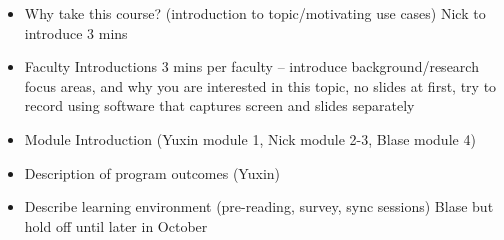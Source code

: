 \documentclass[12pt]{article}
\renewcommand{\_}{\kern-1.5pt\textunderscore\kern-1.5pt}
\begin{document}
\begin{itemize}
	\item Why take this course? (introduction to topic/motivating use cases) Nick to introduce 3 mins \par

	\item Faculty Introductions 3 mins per faculty -- introduce background/research focus areas, and why you are interested in this topic, no slides at first, try to record using software that captures screen and slides separately \par
	
	\item Module Introduction  (Yuxin module 1, Nick module 2-3, Blase module 4)\par

	\item Description of program outcomes (Yuxin) \par

	\item Describe learning environment (pre-reading, survey, sync sessions) Blase but hold off until later in October 
\end{itemize}\par


\newpage

\end{document}
